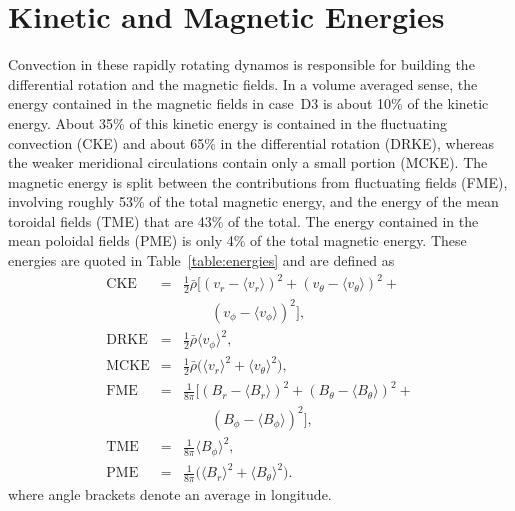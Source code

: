\clearpage
\section{Kinetic and Magnetic Energies}
Convection in these rapidly rotating dynamos is responsible for
building the differential rotation and the magnetic fields.  In a
volume averaged sense, the energy contained in the magnetic fields
in case~D3 is about 10\% of the kinetic energy.  About 35\%
of this kinetic energy is contained in the fluctuating convection
(CKE) and about 65\% in the differential rotation (DRKE), whereas
the weaker meridional circulations contain only a small portion
(MCKE).  The magnetic energy is split between the contributions from
fluctuating fields (FME), involving roughly 53\% of the total magnetic
energy, and the energy of the mean toroidal fields (TME) that are
43\% of the total.  The energy contained in the mean poloidal fields
(PME) is only 4\% of the total magnetic energy.  These energies are
quoted in Table~\ref{table:energies} and are defined as
\begin{eqnarray}
  \mathrm{CKE}  &=& \frac{1}{2}\bar{\rho}\Big[\left(v_r - \langle v_r \rangle\right)^2+\left(v_\theta - \langle v_\theta \rangle\right)^2+\nonumber\\
                & & \qquad \left(v_\phi - \langle v_\phi \rangle\right)^2\Big], \\
  \mathrm{DRKE} &=& \frac{1}{2}\bar{\rho}\langle v_\phi \rangle^2, \\
  \mathrm{MCKE} &=& \frac{1}{2}\bar{\rho}\Big(\langle v_r \rangle^2 + \langle v_\theta \rangle^2 \Big),\\
  \mathrm{FME}  &=& \frac{1}{8\pi}\Big[\left(B_r - \langle B_r \rangle\right)^2+\left(B_\theta - \langle B_\theta \rangle\right)^2+\nonumber\\
                & & \qquad \left(B_\phi - \langle B_\phi \rangle\right)^2\Big], \\
  \mathrm{TME}  &=& \frac{1}{8\pi}\langle B_\phi \rangle^2, \\
  \mathrm{PME}  &=& \frac{1}{8\pi}\Big(\langle B_r \rangle^2 + \langle B_\theta \rangle^2 \Big).
\end{eqnarray}
where angle brackets denote an average in longitude.

